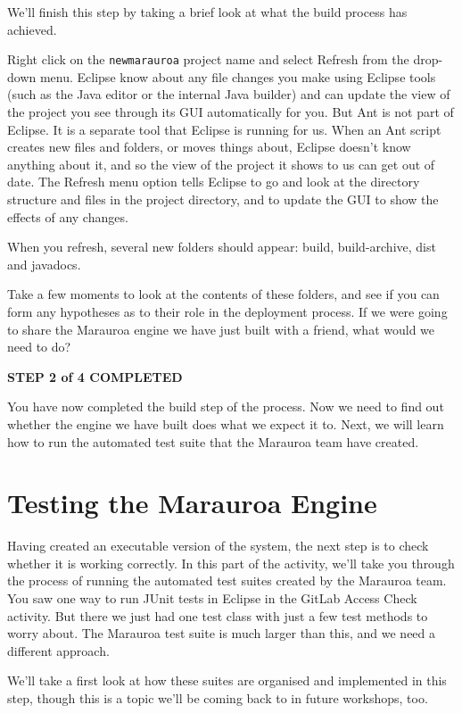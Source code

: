\documentclass[
]{book}
\begin{document}
We'll finish this step by taking a brief look at what the build process has achieved.

Right click on the \texttt{newmarauroa} project name and select Refresh from the drop-down menu. Eclipse know about any file changes you make using Eclipse tools (such as the Java editor or the internal Java builder) and can update the view of the project you see through its GUI automatically for you. But Ant is not part of Eclipse. It is a separate tool that Eclipse is running for us. When an Ant script creates new files and folders, or moves things about, Eclipse doesn't know anything about it, and so the view of the project it shows to us can get out of date. The Refresh menu option tells Eclipse to go and look at the directory structure and files in the project directory, and to update the GUI to show the effects of any changes.

When you refresh, several new folders should appear: build, build-archive, dist and javadocs.

Take a few moments to look at the contents of these folders, and see if you can form any hypotheses as to their role in the deployment process. If we were going to share the Marauroa engine we have just built with a friend, what would we need to do?

\textbf{STEP 2 of 4 COMPLETED}

You have now completed the build step of the process. Now we need to find out whether the engine we have built does what we expect it to. Next, we will learn how to run the automated test suite that the Marauroa team have created.

\hypertarget{testing-the-marauroa-engine}{%
\section{Testing the Marauroa Engine}\label{testing-the-marauroa-engine}}

Having created an executable version of the system, the next step is to check whether it is working correctly. In this part of the activity, we'll take you through the process of running the automated test suites created by the Marauroa team. You saw one way to run JUnit tests in Eclipse in the GitLab Access Check activity. But there we just had one test class with just a few test methods to worry about. The Marauroa test suite is much larger than this, and we need a different approach.

We'll take a first look at how these suites are organised and implemented in this step, though this is a topic we'll be coming back to in future workshops, too.
\end{document}
